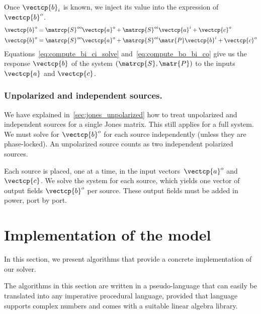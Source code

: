 \begin{refsection}
Once $\vectcp{b}_i$ is known, we inject its value into the expression of $\vectcp{b}^o$.
\begin{subequations}
    \label{eq:compute_bo_co}
    \begin{align}
        \vectcp{b}^o
        &=
        \matrcp{S}^{oo} \vectcp{a}^o +
        \matrcp{S}^{oi} \vectcp{a}^i +
        \vectcp{c}^o
        \label{eq:compute_bo_ai_co}
        \\
        \vectcp{b}^o
        &=
        \matrcp{S}^{oo} \vectcp{a}^o +
        \matrcp{S}^{oi} \matr{P} \vectcp{b}^i +
        \vectcp{c}^o
        \label{eq:compute_bo_bi_co}
    \end{align}
\end{subequations}
Equations~\eqref{eq:compute_bi_ci_solve} and~\eqref{eq:compute_bo_bi_co} give us the response $\vectcp{b}$ of the system $(\matrcp{S}, \matr{P})$ to the inputs $\vectcp{a}$ and $\vectcp{c}$.




\subsubsection{Unpolarized and independent sources.}

We have explained in~\cref{sec:jones_unpolarized} how to treat unpolarized and independent sources for a single Jones matrix.
This still applies for a full system.
We must solve for $\vectcp{b}^o$ for each source independently (unless they are phase-locked).
An unpolarized source counts as two independent polarized sources.

Each source is placed, one at a time, in the input vectors~$\vectcp{a}^o$ and~$\vectcp{c}$.
We solve the system for each source, which yields one vector of output fields $\vectcp{b}^o$ per source.
These output fields must be added in power, port by port.



\FloatBarrier
\section{Implementation of the model}
\label{sec:solver_implementation}
In this section, we present algorithms that provide a concrete implementation of our solver.

The algorithms in this section are written in a pseudo-language that can easily be translated into any imperative procedural language, provided that language supports complex numbers and comes with a suitable linear algebra library.


\end{refsection}
